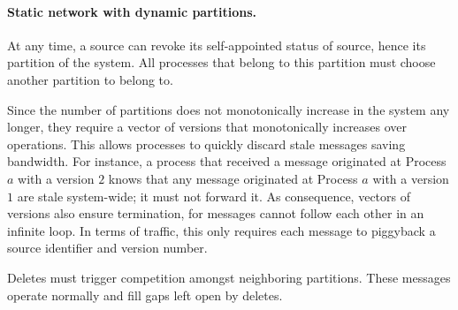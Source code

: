 \paragraph{Static network with dynamic partitions.}
At any time, a source can revoke its self-appointed status of source,
hence  its partition of the system. All processes that
belong to this partition must choose another partition to belong to.

\noindent Since the number of partitions does not monotonically
increase in the system any longer, they require a vector of versions
that monotonically increases over  operations. This
allows processes to quickly discard stale messages saving
bandwidth. For instance, a process that received a message originated
at Process $a$ with a version $2$ knows that any message originated at
Process $a$ with a version $1$ are stale system-wide; it must not
forward it. As consequence, vectors of versions also ensure
termination, for messages  cannot follow each other
in an infinite loop. In terms of traffic, this only requires each
 message to piggyback a source identifier and version
number.


\noindent Deletes must trigger competition amongst neighboring
partitions. These  messages operate normally and fill gaps
left open by deletes.

